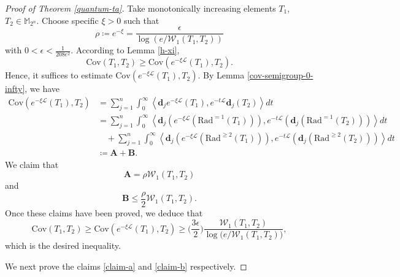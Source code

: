 \documentclass{amsbook}
\theoremstyle{definition}
\theoremstyle{remark}
\numberwithin{section}{chapter}
\numberwithin{equation}{chapter}
\newcommand{\M}{\mathbb{M}}
\newcommand{\1}{\mathbf{1}}
\newcommand{\La}{\mathcal{L}}
\newcommand{\dc}{\mathbf{d}}
\begin{document}
\begin{proof}[Proof of Theorem \ref{quantum-ta}]
Take monotonically increasing elements $T_1$, $T_2\in \M_{2^{n}}$. Choose specific $\xi>0$ such that
\[
\rho\coloneqq e^{-\xi}=\frac{\epsilon}{\log(e/\mathcal{W}_1(T_1,T_2))}
\]
with $0<\epsilon<\frac{1}{208e^{2}}$. According to Lemma 
\ref{h-xi}, 
$$\mathrm{Cov}(T_1,T_2)\geq \mathrm{Cov}\left(e^{-\xi\La}(T_1),T_2\right).$$
Hence, it suffices to estimate $\mathrm{Cov}\left(e^{-\xi\La}(T_1),T_2\right)$.
By Lemma \ref{cov-semigroup-0-infty}, we have
	\begin{equation*}\label{covariance}
		\begin{aligned}
			\mathrm{Cov}\left(e^{-\xi\La}(T_1),T_2\right)&=\sum_{j=1}^n\int_{0}^{\infty}\left\langle \dc_{j}e^{-\xi\La}(T_1),e^{-t\La}\dc_{j}(T_2)\right\rangle dt\\
			&=\sum_{j=1}^{n}\int_{0}^{\infty}\left\langle \dc_{j}\left(e^{-\xi\La}\left(\mathrm{Rad}^{=1}(T_1)\right)\right),e^{-t\La}\left(\dc_{j}(\mathrm{Rad}^{=1}(T_2))\right)\right\rangle dt\\
			&\quad +\sum_{j=1}^{n}\int_{0}^{\infty}\left\langle \dc_{j}\left(e^{-\xi\La}\left(\mathrm{Rad}^{\geq 2}(T_1)\right)\right),e^{-t\La}\left(\dc_{j}(\mathrm{Rad}^{\geq 2}(T_2))\right)\right\rangle dt\\
			&\coloneqq \mathbf{A}+\mathbf{B}.
		\end{aligned}
	\end{equation*}
	We claim that 
	\begin{equation}\label{claim-a}
		\mathbf{A}=\rho \mathcal{W}_1(T_1,T_2)
	\end{equation}
	and 
\begin{equation}\label{claim-b}
	\mathbf{B}\leq \frac{\rho}{2} \mathcal{W}_1(T_1,T_2).
\end{equation}	
Once these claims have been proved, we deduce that
\[
\mathrm{Cov}(T_1,T_2)\geq \mathrm{Cov}\left(e^{-\xi\La}(T_1),T_2\right)\geq \big(\frac{3\epsilon}{2}\big)\frac{\mathcal{W}_1(T_1,T_2)}{\log\Big(e/\mathcal{W}_1(T_1,T_2)\Big)},
\]
which is the desired inequality.


	
	We next prove the claims \eqref{claim-a} and \eqref{claim-b} respectively.




\end{proof}
\end{document}
